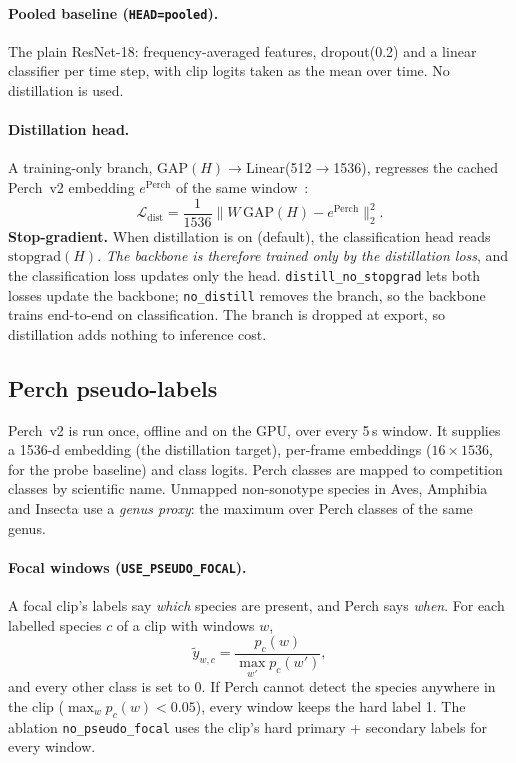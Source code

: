 \documentclass[11pt]{article}
\newcommand{\var}[1]{\texttt{#1}}
\begin{document}
\paragraph{Pooled baseline (\var{HEAD=pooled}).} The plain ResNet-18:
frequency-averaged features, dropout(0.2) and a linear classifier per time
step, with clip logits taken as the mean over time. No distillation is used.

\paragraph{Distillation head.} A training-only branch,
GAP$(H)\rightarrow$Linear(512$\rightarrow$1536), regresses the cached Perch~v2
embedding $e^{\text{Perch}}$ of the same window~\cite{perch,hinton2015}:
\begin{equation}
  \mathcal L_{\text{dist}}=\frac1{1536}\big\|W\,\mathrm{GAP}(H)-e^{\text{Perch}}\big\|_2^2 .
\end{equation}
\textbf{Stop-gradient.} When distillation is on (default), the classification
head reads $\mathrm{stopgrad}(H)$. \emph{The backbone is therefore trained
only by the distillation loss}, and the classification loss updates only the
head. \var{distill\_no\_stopgrad} lets both losses update the backbone;
\var{no\_distill} removes the branch, so the backbone trains end-to-end on
classification. The branch is dropped at export, so distillation adds nothing
to inference cost.

\subsection{Perch pseudo-labels}
\label{sec:pseudo}
Perch~v2 is run once, offline and on the GPU, over every 5\,s window. It
supplies a 1536-d embedding (the distillation target), per-frame embeddings
($16\times1536$, for the probe baseline) and class logits. Perch classes are
mapped to competition classes by scientific name. Unmapped non-sonotype
species in Aves, Amphibia and Insecta use a \emph{genus proxy}: the maximum
over Perch classes of the same genus.

\paragraph{Focal windows (\var{USE\_PSEUDO\_FOCAL}).} A focal clip's labels
say \emph{which} species are present, and Perch says \emph{when}. For each
labelled species $c$ of a clip with windows $w$,
\begin{equation}
  \tilde y_{w,c}=\frac{p_c(w)}{\max_{w'}p_c(w')},
\end{equation}
and every other class is set to 0. If Perch cannot detect the species anywhere
in the clip ($\max_w p_c(w)<0.05$), every window keeps the hard label 1. The
ablation \var{no\_pseudo\_focal} uses the clip's hard primary + secondary
labels for every window.
\end{document}
